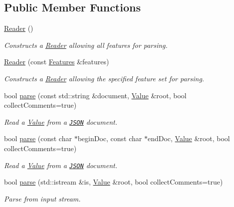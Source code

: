 \subsection*{Public Member Functions}
\begin{DoxyCompactItemize}
\item 
\hyperlink{class_json_1_1_reader_a0b3c4e24c8393354bab57a6ba3ffc27f}{Reader} ()
\begin{DoxyCompactList}\small\item\em Constructs a \hyperlink{class_json_1_1_reader}{Reader} allowing all features for parsing. \end{DoxyCompactList}\item 
\hyperlink{class_json_1_1_reader_a45f17831118337309180313e93ac33f8}{Reader} (const \hyperlink{class_json_1_1_features}{Features} \&features)
\begin{DoxyCompactList}\small\item\em Constructs a \hyperlink{class_json_1_1_reader}{Reader} allowing the specified feature set for parsing. \end{DoxyCompactList}\item 
bool \hyperlink{class_json_1_1_reader_af1da6c976ad1e96c742804c3853eef94}{parse} (const std\-::string \&document, \hyperlink{class_json_1_1_value}{Value} \&root, bool collect\-Comments=true)
\begin{DoxyCompactList}\small\item\em Read a \hyperlink{class_json_1_1_value}{Value} from a \href{http://www.json.org}{\tt J\-S\-O\-N} document. \end{DoxyCompactList}\item 
bool \hyperlink{class_json_1_1_reader_ac71ef2b64c7c27b062052e692af3fb32}{parse} (const char $\ast$begin\-Doc, const char $\ast$end\-Doc, \hyperlink{class_json_1_1_value}{Value} \&root, bool collect\-Comments=true)
\begin{DoxyCompactList}\small\item\em Read a \hyperlink{class_json_1_1_value}{Value} from a \href{http://www.json.org}{\tt J\-S\-O\-N} document. \end{DoxyCompactList}\item 
bool \hyperlink{class_json_1_1_reader_a8d0347e6b47343e4bc68be7ecdb9c4e9}{parse} (std\-::istream \&is, \hyperlink{class_json_1_1_value}{Value} \&root, bool collect\-Comments=true)
\begin{DoxyCompactList}\small\item\em Parse from input stream. \end{DoxyCompactList}\item 

\end{DoxyCompactItemize}
